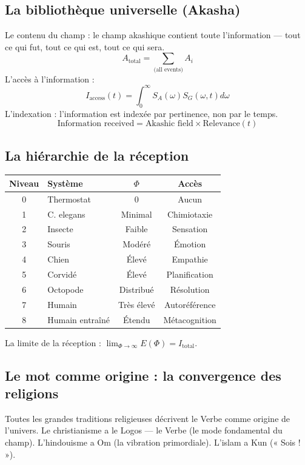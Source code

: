 \documentclass[11pt,a4paper]{article}
\begin{document}
\subsection{La bibliothèque universelle (Akasha)}
Le contenu du champ : le champ akashique contient toute l'information --- tout ce qui fut, tout ce qui est, tout ce qui sera.
\begin{equation}
A_{\text{total}} = \sum_{\text{(all events)}} A_i
\end{equation}
L'accès à l'information :
\begin{equation}
I_{\text{access}}(t) = \int_0^\infty S_A(\omega) S_G(\omega, t) d\omega
\end{equation}
L'indexation : l'information est indexée par pertinence, non par le temps.
\begin{equation}
\text{Information received} = \text{Akashic field} \times \text{Relevance}(t)
\end{equation}

\subsection{La hiérarchie de la réception}
\begin{table}[H]
\centering
\begin{tabular}{@{}clcc@{}}
\toprule
\textbf{Niveau} & \textbf{Système} & \textbf{$\Phi$} & \textbf{Accès} \\ \midrule
0 & Thermostat & 0 & Aucun \\
1 & C. elegans & Minimal & Chimiotaxie \\
2 & Insecte & Faible & Sensation \\
3 & Souris & Modéré & Émotion \\
4 & Chien & Élevé & Empathie \\
5 & Corvidé & Élevé & Planification \\
6 & Octopode & Distribué & Résolution \\
7 & Humain & Très élevé & Autoréférence \\
8 & Humain entraîné & Étendu & Métacognition \\ \bottomrule
\end{tabular}
\end{table}
La limite de la réception : $\lim_{\Phi \rightarrow \infty} E(\Phi) = I_{\text{total}}$.

\subsection{Le mot comme origine : la convergence des religions}
Toutes les grandes traditions religieuses décrivent le Verbe comme origine de l'univers. Le christianisme a le Logos --- le Verbe (le mode fondamental du champ). L'hindouisme a Om (la vibration primordiale). L'islam a Kun (« Sois ! »).
\end{document}
